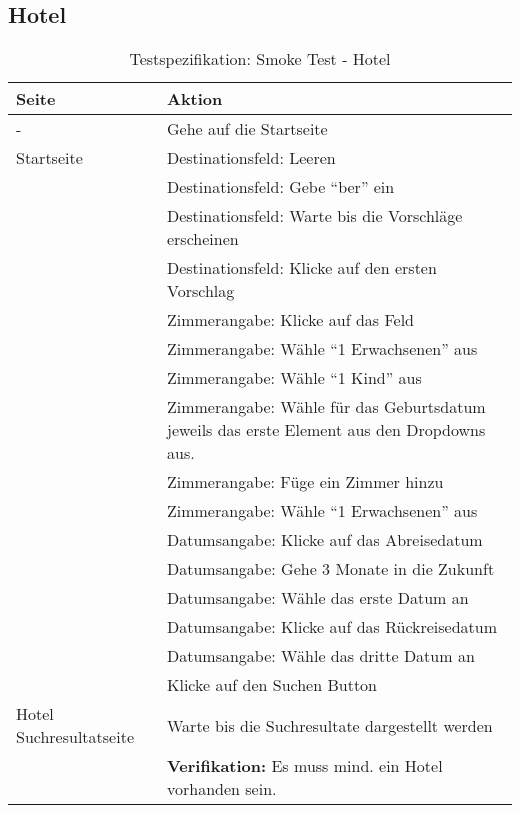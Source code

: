 \subsection{Hotel}
\begin{table}[H] 
	\caption{Testspezifikation: Smoke Test - Hotel}
	\centering
		
	\begin{tabularx}{0.9\textwidth}{ | l | X | } 
			\hline 
			\textbf{Seite} & \textbf{Aktion} \\ \hline 
			\multirow{1}{*}{-} & Gehe auf die Startseite \\ \hline
			\multirow{1}{*}{Startseite} & Destinationsfeld: Leeren \\ \cline{2-2}
			& Destinationsfeld: Gebe "`ber"' ein \\ \cline{2-2}
			& Destinationsfeld: Warte bis die Vorschläge erscheinen \\ \cline{2-2}
			& Destinationsfeld: Klicke auf den ersten Vorschlag \\ \cline{2-2}
			& Zimmerangabe: Klicke auf das Feld \\ \cline{2-2}
			& Zimmerangabe: Wähle "`1 Erwachsenen"' aus \\ \cline{2-2}
			& Zimmerangabe: Wähle "`1 Kind"' aus \\ \cline{2-2}
			& Zimmerangabe: Wähle für das Geburtsdatum jeweils das erste Element aus den Dropdowns aus.  \\ \cline{2-2}
			& Zimmerangabe: Füge ein Zimmer hinzu \\ \cline{2-2}
			& Zimmerangabe: Wähle "`1 Erwachsenen"' aus \\ \cline{2-2}
			& Datumsangabe: Klicke auf das Abreisedatum \\ \cline{2-2}
			& Datumsangabe: Gehe 3 Monate in die Zukunft \\ \cline{2-2}
			& Datumsangabe: Wähle das erste Datum an \\ \cline{2-2}
			& Datumsangabe: Klicke auf das Rückreisedatum \\ \cline{2-2}
			& Datumsangabe: Wähle das dritte Datum an \\ \cline{2-2}
			& Klicke auf den Suchen Button \\ \hline
					
			\multirow{1}{*}{Hotel Suchresultatseite} & Warte bis die Suchresultate dargestellt werden \\ \cline{2-2}
			& \textbf{Verifikation:} Es muss mind. ein Hotel vorhanden sein. \\ \hline
	\end{tabularx} 
\end{table}

